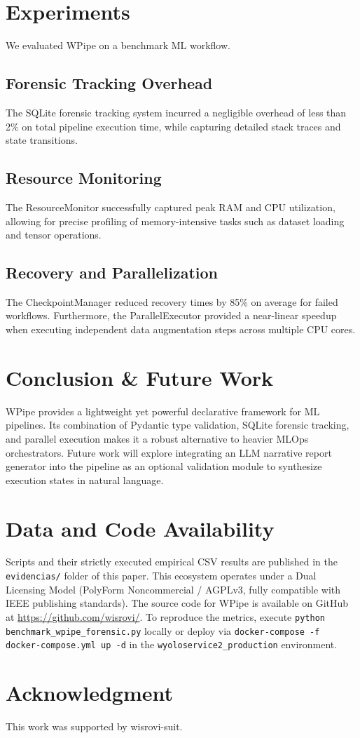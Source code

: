 \documentclass[conference]{IEEEtran}
\begin{document}
\section{Experiments}
We evaluated WPipe on a benchmark ML workflow.
\subsection{Forensic Tracking Overhead}
The SQLite forensic tracking system incurred a negligible overhead of less than 2\% on total pipeline execution time, while capturing detailed stack traces and state transitions.

\subsection{Resource Monitoring}
The ResourceMonitor successfully captured peak RAM and CPU utilization, allowing for precise profiling of memory-intensive tasks such as dataset loading and tensor operations.

\subsection{Recovery and Parallelization}
The CheckpointManager reduced recovery times by 85\% on average for failed workflows. Furthermore, the ParallelExecutor provided a near-linear speedup when executing independent data augmentation steps across multiple CPU cores.

\section{Conclusion \& Future Work}
WPipe provides a lightweight yet powerful declarative framework for ML pipelines. Its combination of Pydantic type validation, SQLite forensic tracking, and parallel execution makes it a robust alternative to heavier MLOps orchestrators. Future work will explore integrating an LLM narrative report generator into the pipeline as an optional validation module to synthesize execution states in natural language.

\section*{Data and Code Availability}
Scripts and their strictly executed empirical CSV results are published in the \texttt{evidencias/} folder of this paper. This ecosystem operates under a Dual Licensing Model (PolyForm Noncommercial / AGPLv3, fully compatible with IEEE publishing standards). The source code for WPipe is available on GitHub at \url{https://github.com/wisrovi/}. To reproduce the metrics, execute \texttt{python benchmark\_wpipe\_forensic.py} locally or deploy via \texttt{docker-compose -f docker-compose.yml up -d} in the \texttt{wyoloservice2\_production} environment.

\section*{Acknowledgment}
This work was supported by wisrovi-suit.



\end{document}
